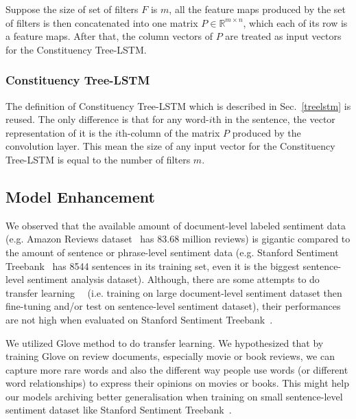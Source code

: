 Suppose the size of set of filters \(F\) is \(m\), all the feature maps produced by the set of filters is then concatenated into one matrix \(P \in \mathbb{R}^{m \times n}\), which each of its row is a feature maps.
After that, the column vectors of \(P\) are treated as input vectors for the Constituency Tree-LSTM.
\subsubsection{Constituency Tree-LSTM}
The definition of Constituency Tree-LSTM which is described in Sec.~\ref{treelstm} is reused.
The only difference is that for any word-\(i\)th in the sentence, the vector representation of it is the \(i\)th-column of the matrix \(P\) produced by the convolution layer.
This mean the size of any input vector for the Constituency Tree-LSTM is equal to the number of filters \(m\).
\subsection{Model Enhancement}
We observed that the available amount of document-level labeled sentiment data (e.g. Amazon Reviews dataset~\cite{amazon-reviews} has 83.68 million reviews) is gigantic compared to the amount of sentence or phrase-level sentiment data (e.g. Stanford Sentiment Treebank~\cite{socher2013recursive} has 8544 sentences in its training set, even it is the biggest sentence-level sentiment analysis dataset).
Although, there are some attempts to do transfer learning~\cite{group-instance}~\cite{re-embedding} (i.e. training on large document-level sentiment dataset then fine-tuning and/or test on sentence-level sentiment dataset), their performances are not high when evaluated on Stanford Sentiment Treebank~\cite{group-instance}.

We utilized Glove method to do transfer learning.
We hypothesized that by training Glove on review documents, especially movie or book reviews, we can capture more rare words and also the different way people use words (or different word relationships) to express their opinions on movies or books.
This might help our models archiving better generalisation when training on small sentence-level sentiment dataset like Stanford Sentiment Treebank~\cite{socher2013recursive}.